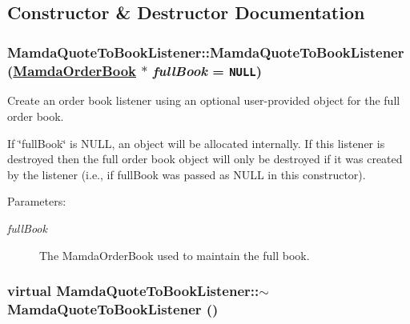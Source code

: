 \subsection{Constructor \& Destructor Documentation}
\hypertarget{classMamdaQuoteToBookListener_9c2fa5fd474cd175f54db508a4ae055c}{
\subsubsection[MamdaQuoteToBookListener]{\setlength{\rightskip}{0pt plus 5cm}Mamda\-Quote\-To\-Book\-Listener::Mamda\-Quote\-To\-Book\-Listener (\hyperlink{classWombat_1_1MamdaOrderBook}{Mamda\-Order\-Book} $\ast$ {\em full\-Book} = {\tt NULL})}}
\label{classMamdaQuoteToBookListener_9c2fa5fd474cd175f54db508a4ae055c}


Create an order book listener using an optional user-provided object for the full order book. 

If \char`\"{}full\-Book\char`\"{} is NULL, an object will be allocated internally. If this listener is destroyed then the full order book object will only be destroyed if it was created by the listener (i.e., if full\-Book was passed as NULL in this constructor).

\begin{Desc}
\item[Parameters:]
\begin{description}
\item[{\em full\-Book}]The Mamda\-Order\-Book used to maintain the full book. \end{description}
\end{Desc}
\hypertarget{classMamdaQuoteToBookListener_8b24434d592b082f17d07c002bd80625}{
\subsubsection[$\sim$MamdaQuoteToBookListener]{\setlength{\rightskip}{0pt plus 5cm}virtual Mamda\-Quote\-To\-Book\-Listener::$\sim$Mamda\-Quote\-To\-Book\-Listener ()}}
\label{classMamdaQuoteToBookListener_8b24434d592b082f17d07c002bd80625}




